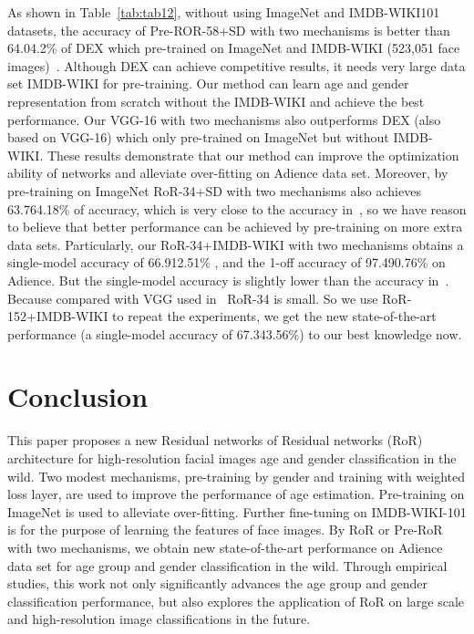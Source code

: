 \documentclass[journal]{IEEEtran}
\begin{document}
As shown in Table~\ref{tab:tab12}, without using ImageNet and IMDB-WIKI101 datasets, the accuracy of Pre-ROR-58+SD with two mechanisms is better than 64.04.2\% of DEX which pre-trained on ImageNet and IMDB-WIKI (523,051 face images)~\cite{Dex}. Although DEX can achieve competitive results, it needs very large data set IMDB-WIKI for pre-training. Our method can learn age and gender representation from scratch without the IMDB-WIKI and achieve the best performance. Our VGG-16 with two mechanisms also outperforms DEX (also based on VGG-16) which only pre-trained on ImageNet but without IMDB-WIKI. These results demonstrate that our method can improve the optimization ability of networks and alleviate over-fitting on Adience data set. Moreover, by pre-training on ImageNet RoR-34+SD with two mechanisms also achieves 63.764.18\% of accuracy, which is very close to the accuracy in~\cite{Dex}, so we have reason to believe that better performance can be achieved by pre-training on more extra data sets. Particularly, our RoR-34+IMDB-WIKI with two mechanisms obtains a single-model accuracy of 66.912.51\% , and the 1-off accuracy of 97.490.76\% on Adience. But the single-model accuracy is slightly lower than the accuracy in~\cite{SAAF+IMDB}. Because compared with VGG used in~\cite{SAAF+IMDB} RoR-34 is small. So we use RoR-152+IMDB-WIKI to repeat the experiments, we get the new state-of-the-art performance (a single-model accuracy of 67.343.56\%) to our best knowledge now. 




\section{Conclusion}\label{sec5}

This paper proposes a new Residual networks of Residual networks (RoR) architecture for high-resolution facial images age and gender classification in the wild. Two modest mechanisms, pre-training by gender and training with weighted loss layer, are used to improve the performance of age estimation. Pre-training on ImageNet is used to alleviate over-fitting. Further fine-tuning on IMDB-WIKI-101 is for the purpose of learning the features of face images. By RoR or Pre-RoR with two mechanisms, we obtain new state-of-the-art performance on Adience data set for age group and gender classification in the wild. Through empirical studies, this work not only significantly advances the age group and gender classification performance, but also explores the application of RoR on large scale and high-resolution image classifications in the future. 
\end{document}
